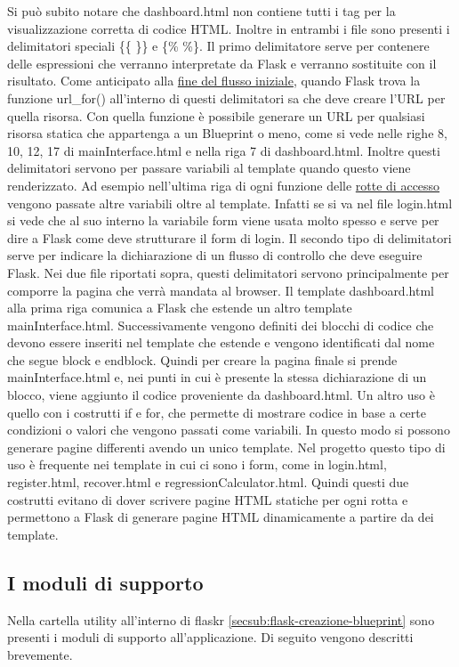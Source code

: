 Si può subito notare che dashboard.html non contiene tutti i tag per la visualizzazione corretta di codice HTML.
Inoltre in entrambi i file sono presenti i delimitatori speciali \{\{ \}\} e \{\% \%\}.
Il primo delimitatore serve per contenere delle espressioni che verranno interpretate da Flask
e verranno sostituite con il risultato.
Come anticipato alla  \hyperlink{lst:flask-creazione-basi-template}{fine del flusso iniziale}, 
quando Flask trova la funzione url\_for() all'interno di questi delimitatori sa che deve creare l'URL per quella risorsa.
Con quella funzione è possibile generare un URL per qualsiasi risorsa statica che appartenga
a un Blueprint o meno, come si vede nelle righe 8, 10, 12, 17 di mainInterface.html 
e nella riga 7 di dashboard.html.
Inoltre questi delimitatori servono per passare variabili al template quando questo viene renderizzato. 
Ad esempio nell'ultima riga di ogni funzione delle \hyperlink{lst:flask-creazione-blueprint-access}{rotte di accesso}
vengono passate altre variabili oltre al template.
Infatti se si va nel file login.html si vede che al suo interno la variabile form viene usata molto spesso
e serve per dire a Flask come deve strutturare il form di login.
Il secondo tipo di delimitatori serve per indicare la dichiarazione di un flusso di controllo che deve eseguire Flask.
Nei due file riportati sopra, questi delimitatori servono principalmente per comporre la pagina che verrà mandata al browser.
Il template dashboard.html alla prima riga comunica a Flask che estende un altro template mainInterface.html.
Successivamente vengono definiti dei blocchi di codice che devono essere inseriti nel template che estende
e vengono identificati dal nome che segue block e endblock.
Quindi per creare la pagina finale si prende mainInterface.html e, nei punti in cui è presente la stessa
dichiarazione di un blocco, viene aggiunto il codice proveniente da dashboard.html.
Un altro uso è quello con i costrutti if e for, che permette di mostrare codice in base a certe condizioni o
valori che vengono passati come variabili.
In questo modo si possono generare pagine differenti avendo un unico template.
Nel progetto questo tipo di uso è frequente nei template in cui ci sono i form, come in
login.html, register.html, recover.html e regressionCalculator.html.
Quindi questi due costrutti evitano di dover scrivere pagine HTML statiche per ogni rotta
e permettono a Flask di generare pagine HTML dinamicamente a partire da dei template. 


\subsection{I moduli di supporto}
\label{secsub:flask-creazione-moduli}
Nella cartella utility all'interno di flaskr \ref{secsub:flask-creazione-blueprint} 
sono presenti i moduli di supporto all'applicazione.
Di seguito vengono descritti brevemente.

